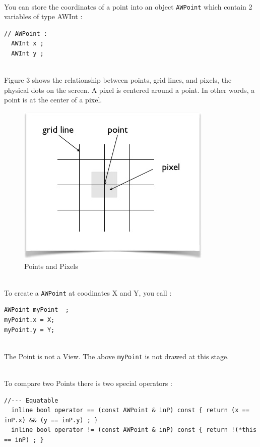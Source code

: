 \documentclass[a4paper,11pt]{extarticle}
\begin{document}
~\\You can store the coordinates of a point into an object \texttt{AWPoint} which contain 2 variables of type AWInt :

\begin{lstlisting}[language=Arduinonl]
// AWPoint :
  AWInt x ;
  AWInt y ;
\end{lstlisting}

~\\Figure 3 shows the relationship between points, grid lines, and pixels, the physical dots on the screen. 
A pixel is centered around a point. In other words, a point is at the center of a pixel.

\begin{figure}[htbp]
   \centering
   \includegraphics[scale=0.8]{AWFig3.png} 
   \caption{Points and Pixels}
   \label{fig:3 }
\end{figure}


~\\To create a \texttt{AWPoint} at coodinates X and Y, you call :
\begin{lstlisting}[language=Arduinonl]
AWPoint myPoint  ;
myPoint.x = X;
myPoint.y = Y;
\end{lstlisting}

~\\ The Point is not a View. The above \texttt{myPoint} is not drawed at this stage.

~\\ To compare two Points there is two special operators :
\begin{lstlisting}[language=Arduinonl]
//--- Equatable
  inline bool operator == (const AWPoint & inP) const { return (x == inP.x) && (y == inP.y) ; }
  inline bool operator != (const AWPoint & inP) const { return !(*this == inP) ; }
\end{lstlisting}
\end{document}

